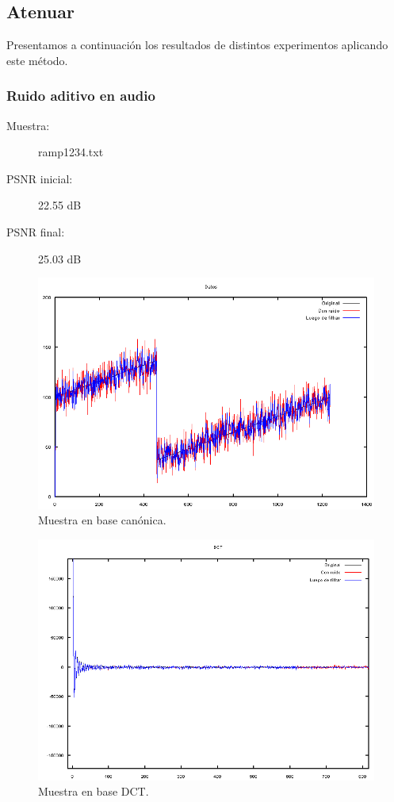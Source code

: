 \documentclass[a4paper,10pt,twoside]{article}
\begin{document}
\subsection{Atenuar}

Presentamos a continuación los resultados de distintos experimentos aplicando este método.

\subsubsection{Ruido aditivo en audio}

\begin{description}
  \item[Muestra:] ramp1234.txt
  \item[PSNR inicial:] 22.55 dB
  \item[PSNR final:] 25.03 dB
\end{description}

\begin{figure}[H]
  \centering
  \includegraphics[width=15cm]{graficos/ramp_aditivo_atenuar_muestra.png}
  \caption{Muestra en base canónica.}
\end{figure}

\begin{figure}[H]
  \centering
  \includegraphics[width=15cm]{graficos/ramp_aditivo_atenuar_dct.png} 
  \caption{Muestra en base DCT.}
\end{figure}
\end{document}

